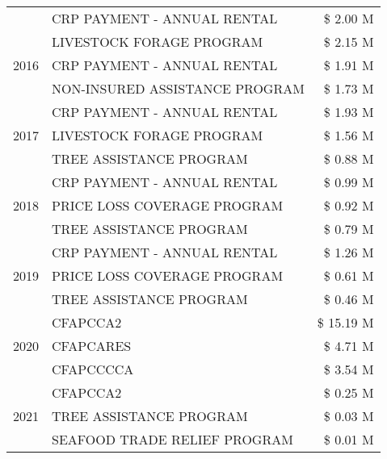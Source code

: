 \begin{tabular}{llr}
 & CRP PAYMENT - ANNUAL RENTAL & \$ 2.00 M \\
\cline{1-3}
\multirow[t]{3}{*}{2016} & LIVESTOCK FORAGE PROGRAM                      & \$ 2.15 M \\
 & CRP PAYMENT - ANNUAL RENTAL                   & \$ 1.91 M \\
 & NON-INSURED ASSISTANCE PROGRAM                & \$ 1.73 M \\
\cline{1-3}
\multirow[t]{3}{*}{2017} & CRP PAYMENT - ANNUAL RENTAL & \$ 1.93 M \\
 & LIVESTOCK FORAGE PROGRAM & \$ 1.56 M \\
 & TREE ASSISTANCE PROGRAM & \$ 0.88 M \\
\cline{1-3}
\multirow[t]{3}{*}{2018} & CRP PAYMENT - ANNUAL RENTAL & \$ 0.99 M \\
 & PRICE LOSS COVERAGE PROGRAM & \$ 0.92 M \\
 & TREE ASSISTANCE PROGRAM & \$ 0.79 M \\
\cline{1-3}
\multirow[t]{3}{*}{2019} & CRP PAYMENT - ANNUAL RENTAL & \$ 1.26 M \\
 & PRICE LOSS COVERAGE PROGRAM & \$ 0.61 M \\
 & TREE ASSISTANCE PROGRAM & \$ 0.46 M \\
\cline{1-3}
\multirow[t]{3}{*}{2020} & CFAPCCA2 & \$ 15.19 M \\
 & CFAPCARES & \$ 4.71 M \\
 & CFAPCCCCA & \$ 3.54 M \\
\cline{1-3}
\multirow[t]{3}{*}{2021} & CFAPCCA2 & \$ 0.25 M \\
 & TREE ASSISTANCE PROGRAM & \$ 0.03 M \\
 & SEAFOOD TRADE RELIEF PROGRAM & \$ 0.01 M \\
\cline{1-3}
\bottomrule
\end{tabular}
